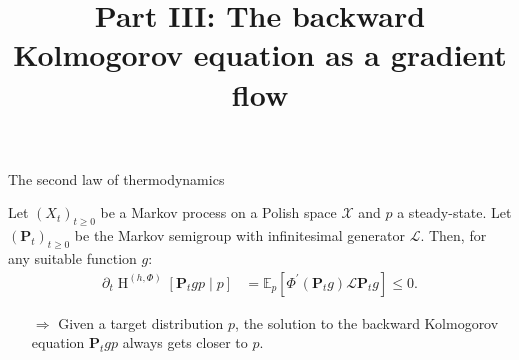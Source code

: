\documentclass{beamer}
\newcommand{\E}{\mathbb E}
\renewcommand{\H}{\operatorname{H}}
\begin{document}
\begin{frame}{The second law of thermodynamics}
    \begin{theorem}
    Let $\left(X_{t}\right)_{t \geqslant 0}$ be a Markov process on a Polish space $\mathcal X$ and $p$ a steady-state. Let $\left(\mathbf{P}_{t}\right)_{t \geqslant 0}$ be the Markov semigroup with infinitesimal generator $\mathcal{L}$. Then, for any suitable function $g$: %
    \begin{align*}
      \partial_{t} \H^{(h,\Phi)}[\mathbf{P}_t gp\mid p ]&=\E_{p}\left[\Phi^{\prime}\left(\mathbf{P}_{t} g\right) \mathcal {L} \mathbf{P}_{t} g\right] \leq 0.
    \end{align*}
\end{theorem}
\begin{itemize}
    \item[$\Rightarrow$] Given a target distribution $p$, the solution to the backward Kolmogorov equation $\mathbf{P}_t g p$ always gets closer to $p$.
\end{itemize}
\end{frame}



\begin{frame}{}
\title{Part III: The backward Kolmogorov equation as a gradient flow}
\author{\vspace{-5ex}}
\institute{\vspace{-5ex}}
\date{\vspace{-5ex}}
    \maketitle
    \small
\end{frame}
\end{document}
